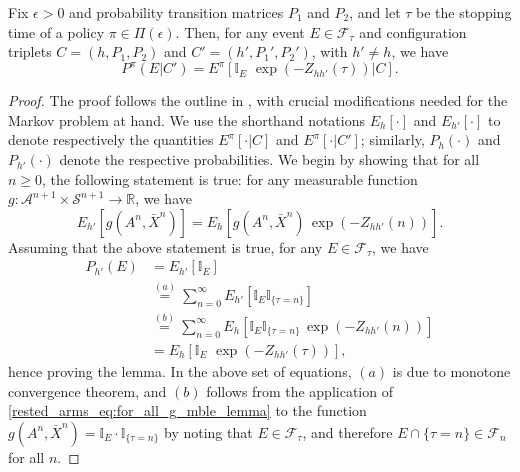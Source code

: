 \begin{lemma}\label{rested_arms_lemma:ChangeOfMeasure_htoh'}
	Fix $\epsilon>0$ and probability transition matrices $P_1$ and $P_2$, and let $\tau$ be the stopping time of a policy $\pi\in\Pi(\epsilon)$. Then, for any event $E\in \mathcal{F}_{\tau}$ and configuration triplets $C=(h,P_1,P_2)$ and $C'=(h',P_1',P_2')$, with $h'\neq h$, we have
	\begin{equation}
	P^\pi(E|C')=E^\pi[\mathbb{I}_{E}\,\,\exp(-Z_{hh'}(\tau))|C].\label{rested_arms_eq:statement_of_lemma_ChangeOfMeasure_htoh'}
	\end{equation}
\end{lemma}

\begin{proof}
The proof follows the outline in \cite{kaufmann2016complexity}, with crucial modifications needed for the Markov problem at hand. We use the shorthand notations $E_{h}[\cdot]$ and $E_{h'}[\cdot]$ to denote respectively the quantities $E^\pi[\cdot|C]$ and $E^\pi[\cdot|C']$; similarly, $P_{h}(\cdot)$ and $P_{h'}(\cdot)$ denote the respective probabilities. We begin by showing that for all $n\geq 0$, the following statement is true: for any measurable function $g:\mathcal{A}^{n+1}\times\mathcal{S}^{n+1}\to \mathbb{R}$, we have
\begin{equation}
E_{h'}[g(A^n,\bar{X}^{n})]=E_{h}[g(A^n,\bar{X}^{n})\,\exp(-Z_{hh'}(n))].\label{rested_arms_eq:for_all_g_mble_lemma}
\end{equation}
Assuming that the above statement is true, for any $E\in \mathcal{F}_{\tau}$, we have
\begingroup\allowdisplaybreaks\begin{align}
P_{h'}(E)&=E_{h'}[\mathbb{I}_{E}]\nonumber\\
&\stackrel{(a)}{=}\sum\limits_{n=0}^{\infty} E_{h'}[\mathbb{I}_{E}\mathbb{I}_{\{\tau=n\}}]\nonumber\\
&\stackrel{(b)}{=}\sum\limits_{n=0}^{\infty} E_{h}[\mathbb{I}_{E}\mathbb{I}_{\{\tau=n\}}\,\exp(-Z_{hh'}(n))]\nonumber\\
&=E_{h}[\mathbb{I}_{E}\,\,\exp(-Z_{hh'}(\tau))],\label{rested_arms_eq:proof_lem_1}
\end{align}\endgroup
hence proving the lemma. In the above set of equations, $(a)$ is due to monotone convergence theorem, and $(b)$ follows from the application of \eqref{rested_arms_eq:for_all_g_mble_lemma} to the function $g(A^n,\bar{X}^{n})=\mathbb{I}_{E}\cdot\mathbb{I}_{\{\tau=n\}}$ by noting that $E\in \mathcal{F}_{\tau}$, and therefore $E\cap\{\tau=n\}\in \mathcal{F}_{n}$ for all $n$.


\end{proof}
